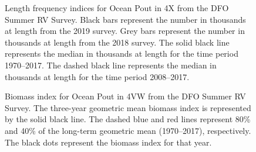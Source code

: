 \documentclass[11pt]{book}
\begin{document}
\begin{figure}[htb]

{\centering {} 

}

\caption{Length frequency indices for Ocean Pout in 4X from the DFO Summer RV Survey. Black bars represent the number in thousands at length from the 2019 survey. Grey bars represent the number in thousands at length from the 2018 survey. The solid black line represents the median in thousands at length for the time period 1970--2017. The dashed black line represents the median in thousands at length for the time period 2008--2017.}\label{fig:120-fig-oceanpout-lengthfreq4X}
\end{figure}

\begin{figure}[htb]

{\centering {} 

}

\caption{Biomass index for Ocean Pout in 4VW from the DFO Summer RV Survey. The three-year geometric mean biomass index is represented by the solid black line. The dashed blue and red lines represent 80\% and 40\% of the long-term geometric mean (1970--2017), respectively. The black dots represent the biomass index for that year.}\label{fig:121-fig-oceanpout-biomass4VW}
\end{figure}
\end{document}
